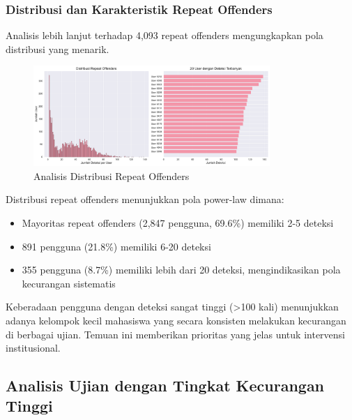 \subsubsection{Distribusi dan Karakteristik Repeat Offenders}

Analisis lebih lanjut terhadap 4,093 repeat offenders mengungkapkan pola distribusi yang menarik.

\begin{figure}[htbp]
    \centering
    \includegraphics[width=0.8\textwidth]{figures/repeat_offender_analysis.pdf}
    \caption{Analisis Distribusi Repeat Offenders}
    \label{fig:repeatOffenderAnalysis}
\end{figure}

Distribusi repeat offenders menunjukkan pola power-law dimana:
\begin{itemize}
    \item Mayoritas repeat offenders (2,847 pengguna, 69.6\%) memiliki 2-5 deteksi
    \item 891 pengguna (21.8\%) memiliki 6-20 deteksi
    \item 355 pengguna (8.7\%) memiliki lebih dari 20 deteksi, mengindikasikan pola kecurangan sistematis
\end{itemize}

Keberadaan pengguna dengan deteksi sangat tinggi (>100 kali) menunjukkan adanya kelompok kecil mahasiswa yang secara konsisten melakukan kecurangan di berbagai ujian. Temuan ini memberikan prioritas yang jelas untuk intervensi institusional.

\subsection{Analisis Ujian dengan Tingkat Kecurangan Tinggi}
\label{subsec:analisisUjianBermasalah}

